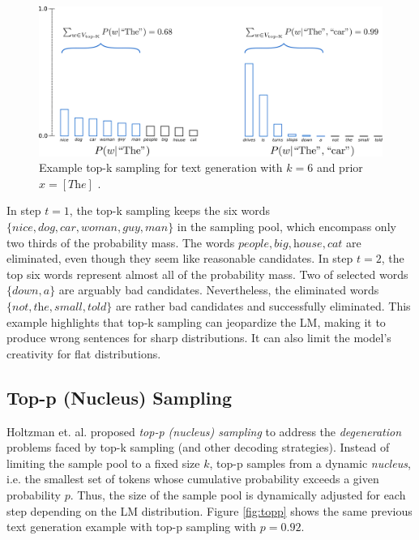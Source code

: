 \begin{figure}[!h]
 \centering
 \includegraphics[width=0.9\columnwidth]{imgs/background/topk.png}
 \caption{Example top-k sampling for text generation with $k=6$ and prior $x = [\textit{The}]$ \cite{platen2020}.}
 \label{fig:topk}
\end{figure}

In step $t=1$, the top-k sampling keeps the six words $\{\textit{nice}, \textit{dog}, \textit{car}, \textit{woman}, \textit{guy}, \textit{man}\}$ in the sampling pool, which encompass only two thirds of the probability mass. The words ${\textit{people}, \textit{big}, \textit{house}, \textit{cat}}$ are eliminated, even though they seem like reasonable candidates. In step $t=2$, the top six words represent almost all of the probability mass. Two of selected words $\{\textit{down}, \textit{a}\}$ are arguably bad candidates. Nevertheless, the eliminated words $\{\textit{not}, \textit{the}, \textit{small}, \textit{told}\}$ are rather bad candidates and successfully eliminated. This example highlights that top-k sampling can jeopardize the LM, making it to produce wrong sentences for sharp distributions. It can also limit the model's creativity for flat distributions.

\subsection{Top-p (Nucleus) Sampling}

Holtzman et. al. \cite{holtzman2019curious} proposed \textit{top-p (nucleus) sampling} to address the \textit{degeneration} problems faced by top-k sampling (and other decoding strategies). Instead of limiting the sample pool to a fixed size $k$, top-p samples from a dynamic \textit{nucleus}, i.e. the smallest set of tokens whose cumulative probability exceeds a given probability $p$. Thus, the size of the sample pool is dynamically adjusted for each step depending on the LM distribution. Figure \ref{fig:topp} shows the same previous text generation example with top-p sampling with $p=0.92$.

